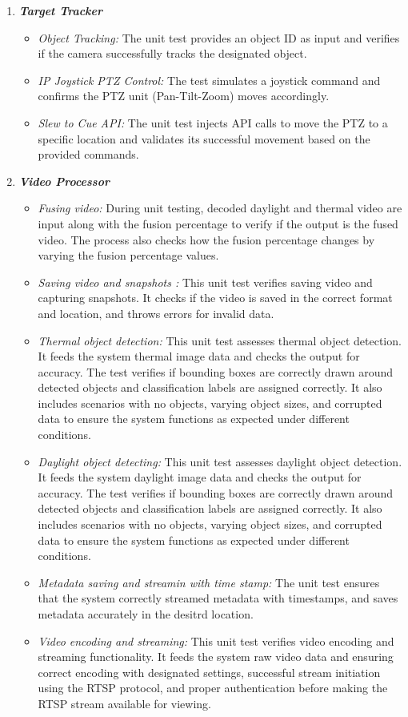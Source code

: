 \documentclass[a4paper,12pt]{article}
\begin{document}
	\begin{enumerate}
		\item \textbf{\textit{Target Tracker}}
		\begin{itemize}
			\item \textit{Object Tracking:}
			The unit test provides an object ID as input and verifies if the camera successfully tracks the designated object.
			\item \textit{IP Joystick PTZ Control:}
			The test simulates a joystick command and confirms the PTZ unit (Pan-Tilt-Zoom) moves accordingly.
			\item \textit{Slew to Cue API:}
			The unit test injects API calls to move the PTZ to a specific location and validates its successful movement based on the provided commands.
		\end{itemize}
		\item \textbf{\textit{Video Processor}}
		\begin{itemize}
			\item \textit{Fusing video:}
			During unit testing, decoded daylight and thermal video are input along with the fusion percentage to verify if the output is the fused video. The process also checks how the fusion percentage changes by varying the fusion percentage values.
			\item \textit { Saving video and snapshots :}
			This unit test verifies saving video and capturing snapshots. It checks if the video is saved in the correct format and location, and throws errors for invalid data. 
			\item \textit{Thermal object detection:}
			This unit test assesses thermal object detection. It feeds the system thermal image data and checks the output for accuracy. The test verifies if bounding boxes are correctly drawn around detected objects and classification labels are assigned correctly. It also includes scenarios with no objects, varying object sizes, and corrupted data to ensure the system functions as expected under different conditions.
			\item \textit{Daylight object detecting:}
			This unit test assesses daylight object detection. It feeds the system daylight image data and checks the output for accuracy. The test verifies if bounding boxes are correctly drawn around detected objects and classification labels are assigned correctly. It also includes scenarios with no objects, varying object sizes, and corrupted data to ensure the system functions as expected under different conditions.
			\item \textit{Metadata saving and streamin with time stamp:}
			The unit test  ensures that the system correctly streamed metadata with timestamps, and saves metadata accurately in the desitrd location. 
			\item \textit{Video encoding and streaming:}
			This unit test verifies video encoding and streaming functionality. It feeds the system raw video data and  ensuring correct encoding with designated settings, successful stream initiation using the RTSP protocol, and proper authentication before making the RTSP stream available for viewing.
			

\end{itemize}
\end{enumerate}
\end{document}
